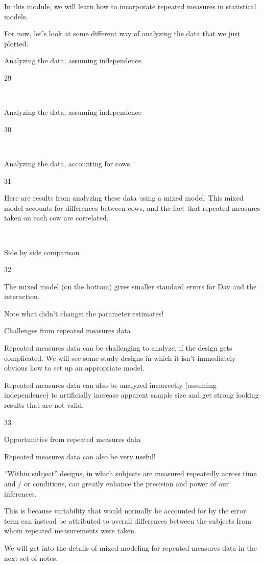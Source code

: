 \documentclass[
  letterpaper,
  DIV=11,
  numbers=noendperiod]{scrreprt}
\begin{document}
In this module, we will learn how to incorporate repeated measures in
statistical models.

For now, let's look at some different way of analyzing the data that we
just plotted.

Analyzing the data, assuming independence

29

~

Analyzing the data, assuming independence

30

~

Analyzing the data, accounting for cows

31

Here are results from analyzing these data using a mixed model. This
mixed model accounts for differences between cows, and the fact that
repeated measures taken on each cow are correlated.

~

Side by side comparison

32

The mixed model (on the bottom) gives smaller standard errors for Day
and the interaction.

Note what didn't change: the parameter estimates!

Challenges from repeated measures data

Repeated measures data can be challenging to analyze, if the design gets
complicated. We will see some study designs in which it isn't
immediately obvious how to set up an appropriate model.

Repeated measures data can also be analyzed incorrectly (assuming
independence) to artificially increase apparent sample size and get
strong looking results that are not valid.

33

Opportunities from repeated measures data

Repeated measures data can also be very useful!

``Within subject'' designs, in which subjects are measured repeatedly
across time and / or conditions, can greatly enhance the precision and
power of our inferences.

This is because variability that would normally be accounted for by the
error term can instead be attributed to overall differences between the
subjects from whom repeated measurements were taken.

We will get into the details of mixed modeling for repeated measures
data in the next set of notes.
\end{document}
